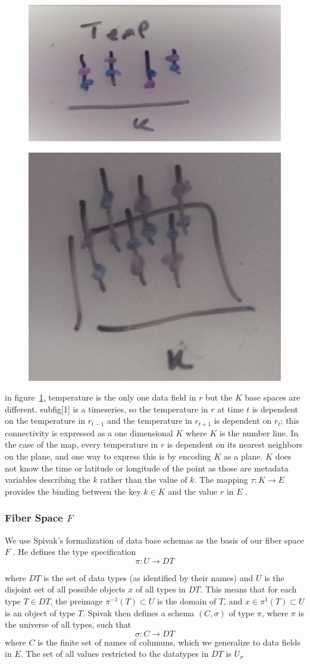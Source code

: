 \documentclass[../main.tex]{subfiles}
\begin{document}
\begin{figure}[ht]
    \includegraphics[width=0.2\linewidth]{figures/sections/math/temp_1k.png}
    \label{fig:k_data}
\end{figure}
\begin{figure}[ht]
    \includegraphics[width=0.2\linewidth]{figures/sections/math/temp_2k.png}
\end{figure}

in figure~\ref{fig:k_data}, temperature is the only one data field in $r$ but the $K$ base spaces are different. subfig[1] is a timeseries, so the temperature in $r$ at time $t$ is dependent on the temperature in $r_{t-1}$ and the temperature in $r_{t+1}$ is dependent on  $r_t$; this connectivity is expressed as a one dimensional $K$ where $K$ is the number line. In the case of the map, every temperature in $r$ is dependent on its nearest neighbors on the plane, and one way to express this is by encoding $K$ as a plane. $K$ does not know the time or latitude or longitude of the point as those are metadata variables describing the $k$ rather than the value of $k$. The mapping $\tau: K \rightarrow E$ provides the binding between the key $k \in K$ and the value $r$ in $E$ \cite{munznerChDataAbstraction}.

\subsubsection{Fiber Space $F$}
We use Spivak's formalization of data base schemas as the basis of our fiber space $F$ \cite{spivakSIMPLICIALDATABASES}. He defines the type specification 
\begin{equation}
\pi: U \rightarrow DT
\end{equation}

where $DT$ is the set of data types (as identified by their names) and $U$ is the disjoint set of all possible objects $x$ of all types in $DT$. This means that for each type $T\in DT$, the preimage $\pi^{-1}(T)\subset U $ is the domain of $T$, and $x \in \pi^{1}(T)\subset U$ is an object of type $T$. Spivak then defines a schema $(C, \sigma)$ of type $\pi$, where $\pi$ is the universe of all types, such that 
\begin{equation}
\sigma: C \rightarrow DT
\end{equation}
where $C$ is the finite set of names of columuns, which we generalize to data fields in $E$. The set of all values restricted to the datatypes in $DT$ is $U_{\sigma}$
\end{document}
